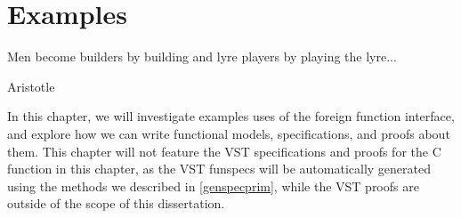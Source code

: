 \chapter{Examples}
\label{examples}

\epigraph{Men become builders by building and lyre players by playing the lyre...}{Aristotle~\cite{2016nicomachean}}

In this chapter, we will investigate examples uses of the foreign function interface, and explore how we can write functional models, specifications, and proofs about them.
This chapter will not feature the VST specifications and proofs for the C function in this chapter, as the VST funspecs will be automatically generated using the methods we described in \autoref{genspecprim}, while the VST proofs are outside of the scope of this dissertation.